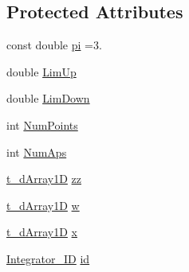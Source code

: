 \subsection*{Protected Attributes}
\begin{DoxyCompactItemize}
\item 
const double \hyperlink{class_c___integration_nodes_a2db6e5b500d59df584a1556fd2e928f4}{pi} =3.
\item 
double \hyperlink{class_c___integration_nodes_a9d7f3f12030b61afb7d11ff833b92ab2}{Lim\-Up}
\item 
double \hyperlink{class_c___integration_nodes_aa2b7209a4f2aa65d90ca2cc1f22655ab}{Lim\-Down}
\item 
int \hyperlink{class_c___integration_nodes_a2aae6c2f677378b02fe1dd72137d5649}{Num\-Points}
\item 
int \hyperlink{class_c___integration_nodes_a1bf574f9151846abaeb89c2a9acca173}{Num\-Aps}
\item 
\hyperlink{types_8h_a7572e8a35cd6501ce959f177307310a4}{t\-\_\-d\-Array1\-D} \hyperlink{class_c___integration_nodes_abced67ac9650b49ca756fe34b0aa593a}{zz}
\item 
\hyperlink{types_8h_a7572e8a35cd6501ce959f177307310a4}{t\-\_\-d\-Array1\-D} \hyperlink{class_c___integration_nodes_a023a6f295be0574aca58f8a67ac6263d}{w}
\item 
\hyperlink{types_8h_a7572e8a35cd6501ce959f177307310a4}{t\-\_\-d\-Array1\-D} \hyperlink{class_c___integration_nodes_ac7482a184d19e0ec9bf62a99edd9e29b}{x}
\item 
\hyperlink{_integration_nodes_8hpp_a8a2a136fba71c4785a5bdfe3e0e23b2b}{Integrator\-\_\-\-I\-D} \hyperlink{class_c___integration_nodes_a1c7d0366d7ce1134f6a4c0944f80803b}{id}
\end{DoxyCompactItemize}


